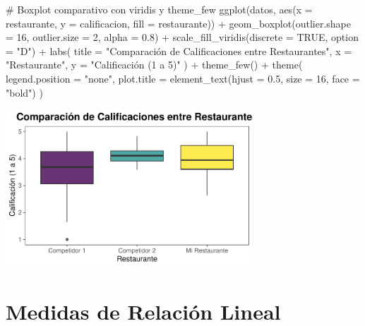 \documentclass[
  spanish,
  letterpaper,
  DIV=11,
  numbers=noendperiod]{scrreprt}
\newenvironment{Shaded}{\begin{snugshade}}{\end{snugshade}}
\newcommand{\AttributeTok}[1]{\textcolor[rgb]{0.40,0.45,0.13}{#1}}
\newcommand{\CommentTok}[1]{\textcolor[rgb]{0.37,0.37,0.37}{#1}}
\newcommand{\ConstantTok}[1]{\textcolor[rgb]{0.56,0.35,0.01}{#1}}
\newcommand{\DecValTok}[1]{\textcolor[rgb]{0.68,0.00,0.00}{#1}}
\newcommand{\FloatTok}[1]{\textcolor[rgb]{0.68,0.00,0.00}{#1}}
\newcommand{\FunctionTok}[1]{\textcolor[rgb]{0.28,0.35,0.67}{#1}}
\newcommand{\NormalTok}[1]{\textcolor[rgb]{0.00,0.23,0.31}{#1}}
\newcommand{\SpecialCharTok}[1]{\textcolor[rgb]{0.37,0.37,0.37}{#1}}
\newcommand{\StringTok}[1]{\textcolor[rgb]{0.13,0.47,0.30}{#1}}
\begin{document}
\begin{Shaded}
\begin{Highlighting}[]
\CommentTok{\# Boxplot comparativo con viridis y theme\_few}
\FunctionTok{ggplot}\NormalTok{(datos, }\FunctionTok{aes}\NormalTok{(}\AttributeTok{x =}\NormalTok{ restaurante, }\AttributeTok{y =}\NormalTok{ calificacion, }\AttributeTok{fill =}\NormalTok{ restaurante)) }\SpecialCharTok{+}
  \FunctionTok{geom\_boxplot}\NormalTok{(}\AttributeTok{outlier.shape =} \DecValTok{16}\NormalTok{, }\AttributeTok{outlier.size =} \DecValTok{2}\NormalTok{, }\AttributeTok{alpha =} \FloatTok{0.8}\NormalTok{) }\SpecialCharTok{+}
  \FunctionTok{scale\_fill\_viridis}\NormalTok{(}\AttributeTok{discrete =} \ConstantTok{TRUE}\NormalTok{, }\AttributeTok{option =} \StringTok{"D"}\NormalTok{) }\SpecialCharTok{+}
  \FunctionTok{labs}\NormalTok{(}
    \AttributeTok{title =} \StringTok{"Comparación de Calificaciones entre Restaurantes"}\NormalTok{,}
    \AttributeTok{x =} \StringTok{"Restaurante"}\NormalTok{,}
    \AttributeTok{y =} \StringTok{"Calificación (1 a 5)"}
\NormalTok{  ) }\SpecialCharTok{+}
  \FunctionTok{theme\_few}\NormalTok{() }\SpecialCharTok{+}
  \FunctionTok{theme}\NormalTok{(}
    \AttributeTok{legend.position =} \StringTok{"none"}\NormalTok{,}
    \AttributeTok{plot.title =} \FunctionTok{element\_text}\NormalTok{(}\AttributeTok{hjust =} \FloatTok{0.5}\NormalTok{, }\AttributeTok{size =} \DecValTok{16}\NormalTok{, }\AttributeTok{face =} \StringTok{"bold"}\NormalTok{)}
\NormalTok{  )}
\end{Highlighting}
\end{Shaded}

\begin{center}
\includegraphics[width=3.64583in,height=\textheight,keepaspectratio]{capitulo3_files/figure-pdf/unnamed-chunk-12-1.pdf}
\end{center}

\section{Medidas de Relación
Lineal}\label{medidas-de-relaciuxf3n-lineal}
\end{document}
